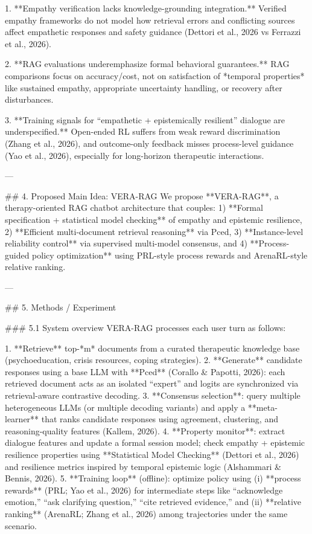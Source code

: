 1. **Empathy verification lacks knowledge-grounding integration.** Verified empathy frameworks do not model how retrieval errors and conflicting sources affect empathetic responses and safety guidance (Dettori et al., 2026 vs Ferrazzi et al., 2026).

2. **RAG evaluations underemphasize formal behavioral guarantees.** RAG comparisons focus on accuracy/cost, not on satisfaction of *temporal properties* like sustained empathy, appropriate uncertainty handling, or recovery after disturbances.

3. **Training signals for “empathetic + epistemically resilient” dialogue are underspecified.** Open-ended RL suffers from weak reward discrimination (Zhang et al., 2026), and outcome-only feedback misses process-level guidance (Yao et al., 2026), especially for long-horizon therapeutic interactions.

---

## 4. Proposed Main Idea: VERA-RAG  
We propose **VERA-RAG**, a therapy-oriented RAG chatbot architecture that couples:  
1) **Formal specification + statistical model checking** of empathy and epistemic resilience,  
2) **Efficient multi-document retrieval reasoning** via Pced,  
3) **Instance-level reliability control** via supervised multi-model consensus, and  
4) **Process-guided policy optimization** using PRL-style process rewards and ArenaRL-style relative ranking.

---

## 5. Methods / Experiment  

### 5.1 System overview  
VERA-RAG processes each user turn as follows:

1. **Retrieve** top-*m* documents from a curated therapeutic knowledge base (psychoeducation, crisis resources, coping strategies).  
2. **Generate** candidate responses using a base LLM with **Pced** (Corallo & Papotti, 2026): each retrieved document acts as an isolated “expert” and logits are synchronized via retrieval-aware contrastive decoding.  
3. **Consensus selection**: query multiple heterogeneous LLMs (or multiple decoding variants) and apply a **meta-learner** that ranks candidate responses using agreement, clustering, and reasoning-quality features (Kallem, 2026).  
4. **Property monitor**: extract dialogue features and update a formal session model; check empathy + epistemic resilience properties using **Statistical Model Checking** (Dettori et al., 2026) and resilience metrics inspired by temporal epistemic logic (Alshammari & Bennis, 2026).  
5. **Training loop** (offline): optimize policy using (i) **process rewards** (PRL; Yao et al., 2026) for intermediate steps like “acknowledge emotion,” “ask clarifying question,” “cite retrieved evidence,” and (ii) **relative ranking** (ArenaRL; Zhang et al., 2026) among trajectories under the same scenario.

